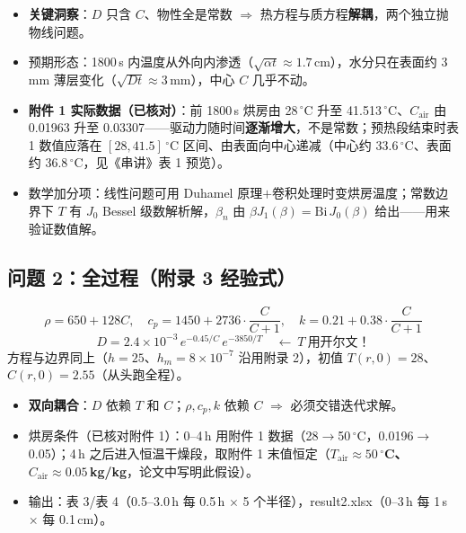 \documentclass[12pt,a4paper]{ctexart}
\begin{document}
\begin{itemize}
\item \textbf{关键洞察}：$D$ 只含 $C$、物性全是常数 $\Rightarrow$ 热方程与质方程\textbf{解耦}，两个独立抛物线问题。
\item 预期形态：1800\,s 内温度从外向内渗透（$\sqrt{\alpha t}\approx1.7$\,cm），水分只在表面约 3\,mm 薄层变化（$\sqrt{Dt}\approx3$\,mm），中心 $C$ 几乎不动。
\item \textbf{附件 1 实际数据（已核对）}：前 1800\,s 烘房由 28\,$^\circ$C 升至 41.513\,$^\circ$C、$C_{\mathrm{air}}$ 由 0.01963 升至 0.03307——驱动力随时间\textbf{逐渐增大}，不是常数；预热段结束时表 1 数值应落在 $[28,41.5]$\,$^\circ$C 区间、由表面向中心递减（中心约 33.6\,$^\circ$C、表面约 36.8\,$^\circ$C，见《串讲》表 1 预览）。
\item 数学加分项：线性问题可用 Duhamel 原理$+$卷积处理时变烘房温度；常数边界下 $T$ 有 $J_0$ Bessel 级数解析解，$\beta_n$ 由 $\beta J_1(\beta)=\mathrm{Bi}\,J_0(\beta)$ 给出——用来验证数值解。
\end{itemize}

\subsection{问题 2：全过程（附录 3 经验式）}
\begin{equation}
\rho=650+128C,\quad c_p=1450+2736\cdot\frac{C}{C+1},\quad k=0.21+0.38\cdot\frac{C}{C+1}
\end{equation}
\begin{equation}
D=2.4\times10^{-3}\,e^{-0.45/C}\,e^{-3850/T}\quad \leftarrow\ T\ \text{用开尔文！}
\end{equation}
方程与边界同上（$h=25$、$h_m=8\times10^{-7}$ 沿用附录 2），初值 $T(r,0)=28$、$C(r,0)=2.55$（从头跑全程）。

\begin{itemize}
\item \textbf{双向耦合}：$D$ 依赖 $T$ 和 $C$；$\rho,c_p,k$ 依赖 $C$ $\Rightarrow$ 必须交错迭代求解。
\item 烘房条件（已核对附件 1）：0--4\,h 用附件 1 数据（28$\to$50\,$^\circ$C，0.0196$\to$0.05）；4\,h 之后进入恒温干燥段，取附件 1 末值恒定（\textbf{$T_{\mathrm{air}}\approx50\,^\circ$C、$C_{\mathrm{air}}\approx0.05$\,kg/kg}，论文中写明此假设）。
\item 输出：表 3/表 4（0.5--3.0\,h 每 0.5\,h $\times$ 5 个半径），result2.xlsx（0--3\,h 每 1\,s $\times$ 每 0.1\,cm）。
\end{itemize}
\end{document}

